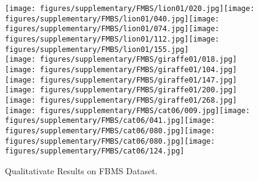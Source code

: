 \documentclass{bmvc2k}
\begin{document}
 \begin{figure}[h]
\centering
\texttt{[image: figures/supplementary/FMBS/lion01/020.jpg]}\hspace{1px}\texttt{[image: figures/supplementary/FMBS/lion01/040.jpg]}\hspace{1px}\texttt{[image: figures/supplementary/FMBS/lion01/074.jpg]}\hspace{1px}\texttt{[image: figures/supplementary/FMBS/lion01/112.jpg]}\hspace{1px}\texttt{[image: figures/supplementary/FMBS/lion01/155.jpg]}\\
\texttt{[image: figures/supplementary/FMBS/giraffe01/018.jpg]}\hspace{1px}\texttt{[image: figures/supplementary/FMBS/giraffe01/104.jpg]}\hspace{1px}
  \texttt{[image: figures/supplementary/FMBS/giraffe01/147.jpg]}\hspace{1px}\texttt{[image: figures/supplementary/FMBS/giraffe01/200.jpg]}\hspace{1px}\texttt{[image: figures/supplementary/FMBS/giraffe01/268.jpg]}\\
\texttt{[image: figures/supplementary/FMBS/cat06/009.jpg]}\hspace{1px}\texttt{[image: figures/supplementary/FMBS/cat06/041.jpg]}\hspace{1px}\texttt{[image: figures/supplementary/FMBS/cat06/080.jpg]}\hspace{1px}\texttt{[image: figures/supplementary/FMBS/cat06/080.jpg]}\hspace{1px}\texttt{[image: figures/supplementary/FMBS/cat06/124.jpg]}\\
  \caption{Qualitativate Results on FBMS Dataset.}
  \end{figure}
 \vspace{-15pt}
\end{document}
